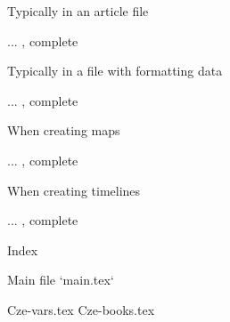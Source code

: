 {{{{\secc Typically in an article file

... \TODO, complete

\secc Typically in a file with formatting data

... \TODO, complete

\secc When creating maps

... \TODO, complete

\secc When creating timelines

... \TODO, complete




\sec Index

\def\_sortinglang{en}
\typosize[9/]
\makeindex
\endmulti

\bye





 Main file `main.tex`

\begtt
\load[opbible] %
\cslang

\def\shadowparameter{.1}%



\def\tmark {BKR} %

 {Cze-vars.tex} %
 {Cze-books.tex} %

\def\txsfile {sources/Cze\tmark-\bmark.txs} %
\def\fmtfile {formats/fmt-Cze\tmark-\amark.tex} %
\def\notesfile {notes/notes-\amark.tex} %
\def\introfile {others/intro-\amark.tex} %
\def\articlefile {others/articles-\amark.tex} %

}}}}

